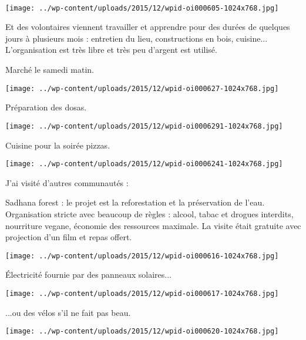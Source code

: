 ~
\vspace{-0.75mm}
 \begin{center} \texttt{[image: ../wp-content/uploads/2015/12/wpid-oi000605-1024x768.jpg]} \end{center}

 Et des volontaires viennent travailler et apprendre pour des durées de quelques jours à plusieurs mois : entretien du lieu, constructions en bois, cuisine... L'organisation est très libre et très peu d'argent est utilisé. 

 Marché le samedi matin. 
\begin{center} \texttt{[image: ../wp-content/uploads/2015/12/wpid-oi000627-1024x768.jpg]} \end{center}
\vspace{-\topsep}
\pagebreak
 
 Préparation des dosas. 
\begin{center} \texttt{[image: ../wp-content/uploads/2015/12/wpid-oi0006291-1024x768.jpg]} \end{center}

  Cuisine pour la soirée pizzas. 
\begin{center} \texttt{[image: ../wp-content/uploads/2015/12/wpid-oi0006241-1024x768.jpg]} \end{center}

  J'ai visité d'autres communautés : 

 Sadhana forest : le projet est la reforestation et la préservation de l'eau. Organisation stricte avec beaucoup de règles : alcool, tabac et drogues interdits, nourriture vegane, économie des ressources maximale. La visite était gratuite avec projection d'un film et repas offert. 
\begin{center} \texttt{[image: ../wp-content/uploads/2015/12/wpid-oi000616-1024x768.jpg]} \end{center}

 Électricité fournie par des panneaux solaires...
\begin{center} \texttt{[image: ../wp-content/uploads/2015/12/wpid-oi000617-1024x768.jpg]} \end{center}
\vspace{-\topsep}
\pagebreak

  ...ou des vélos s'il ne fait pas beau. \\
\begin{center} \texttt{[image: ../wp-content/uploads/2015/12/wpid-oi000620-1024x768.jpg]} \end{center}

